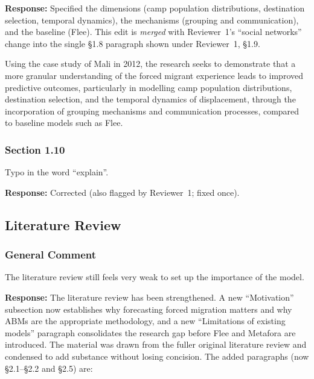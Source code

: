 \documentclass[11pt,a4paper]{article}
\begin{document}
\textbf{Response:} Specified the dimensions (camp population distributions, destination selection, temporal
dynamics), the mechanisms (grouping and communication), and the baseline (Flee). This edit is \emph{merged} with
Reviewer~1's ``social networks'' change into the single §1.8 paragraph shown under Reviewer~1, §1.9.

\vspace{0.3cm}
\begin{updatebox}
Using the case study of Mali in 2012, the research seeks to demonstrate that a more granular understanding of the forced
migrant experience leads to improved predictive outcomes, particularly in modelling camp population distributions,
destination selection, and the temporal dynamics of displacement, through the incorporation of grouping mechanisms and
communication processes, compared to baseline models such as Flee.
\end{updatebox}

\subsubsection*{Section 1.10}

\begin{reviewbox}
Typo in the word ``explain''.
\end{reviewbox}

\textbf{Response:} Corrected (also flagged by Reviewer~1; fixed once).

\subsection*{Literature Review}

\subsubsection*{General Comment}

\begin{reviewbox}
The literature review still feels very weak to set up the importance of the model.
\end{reviewbox}

\textbf{Response:} The literature review has been strengthened. A new ``Motivation'' subsection now establishes
why forecasting forced migration matters and why ABMs are the appropriate methodology, and a new ``Limitations of
existing models'' paragraph consolidates the research gap before Flee and Metafora are introduced. The material
was drawn from the fuller original literature review and condensed to add substance without losing concision.
The added paragraphs (now §2.1--§2.2 and §2.5) are:
\end{document}
